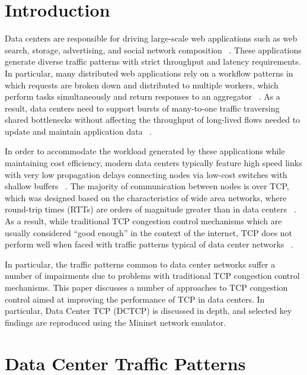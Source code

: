 \section{Introduction}

Data centers are responsible for driving large-scale web applications such as web search, storage, advertising, and social network composition ~\cite{chen_understanding_2009, alizadeh_data_2010}. These applications generate diverse traffic patterns with strict throughput and latency requirements. In particular, many distributed web applications rely on a workflow patterns in which requests are broken down and distributed to multiple workers, which perform tasks simultaneously and return responses to an aggregator ~\cite{chen_understanding_2009, alizadeh_data_2010}. As a result, data centers need to support bursts of many-to-one traffic traversing shared bottlenecks without affecting the throughput of long-lived flows needed to update and maintain application data ~\cite{alizadeh_data_2010}.

In order to accommodate the workload generated by these applications while maintaining cost efficiency, modern data centers typically feature high speed links with very low propagation delays connecting nodes via low-cost switches with shallow buffers ~\cite{chen_understanding_2009, hamilton_designing_2007, alizadeh_data_2010}. The majority of communication between nodes is over TCP, which was designed based on the characteristics of wide area networks, where round-trip times (RTTs) are orders of magnitude greater than in data centers ~\cite{chen_understanding_2009}. As a result, while traditional TCP congestion control mechanisms which are usually considered ``good enough'' in the context of the internet, TCP does not perform well when faced with traffic patterns typical of data center networks ~\cite{chen_understanding_2009, phanishayee_measurement_2008}. 

In particular, the traffic patterns common to data center networks suffer a number of impairments due to problems with traditional TCP congestion control mechanisms. This paper discusses a number of approaches to TCP congestion control aimed at improving the performance of TCP in data centers. In particular, Data Center TCP (DCTCP) is discussed in depth, and selected key findings are reproduced using the Mininet network emulator.

\section{Data Center Traffic Patterns}

